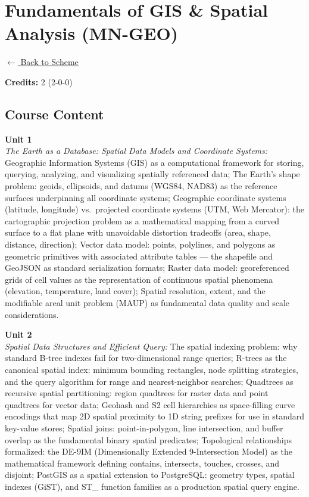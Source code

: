 \section*{Fundamentals of GIS \& Spatial Analysis (MN-GEO)}
\label{minor:GEO_L1}

\noindent \small{\hyperref[main:scheme]{$\leftarrow$ Back to Scheme}} \vspace{0.5cm}

\noindent \textbf{Credits:} 2 (2-0-0)

\subsection*{Course Content}
\noindent\textbf{Unit 1} \\
\textit{The Earth as a Database: Spatial Data Models and Coordinate Systems:} Geographic Information Systems (GIS) as a computational framework for storing, querying, analyzing, and visualizing spatially referenced data; The Earth's shape problem: geoids, ellipsoids, and datums (WGS84, NAD83) as the reference surfaces underpinning all coordinate systems; Geographic coordinate systems (latitude, longitude) vs.\ projected coordinate systems (UTM, Web Mercator): the cartographic projection problem as a mathematical mapping from a curved surface to a flat plane with unavoidable distortion tradeoffs (area, shape, distance, direction); Vector data model: points, polylines, and polygons as geometric primitives with associated attribute tables — the shapefile and GeoJSON as standard serialization formats; Raster data model: georeferenced grids of cell values as the representation of continuous spatial phenomena (elevation, temperature, land cover); Spatial resolution, extent, and the modifiable areal unit problem (MAUP) as fundamental data quality and scale considerations.

\vspace{0.3cm}

\noindent\textbf{Unit 2} \\
\textit{Spatial Data Structures and Efficient Query:} The spatial indexing problem: why standard B-tree indexes fail for two-dimensional range queries; R-trees as the canonical spatial index: minimum bounding rectangles, node splitting strategies, and the query algorithm for range and nearest-neighbor searches; Quadtrees as recursive spatial partitioning: region quadtrees for raster data and point quadtrees for vector data; Geohash and S2 cell hierarchies as space-filling curve encodings that map 2D spatial proximity to 1D string prefixes for use in standard key-value stores; Spatial joins: point-in-polygon, line intersection, and buffer overlap as the fundamental binary spatial predicates; Topological relationships formalized: the DE-9IM (Dimensionally Extended 9-Intersection Model) as the mathematical framework defining contains, intersects, touches, crosses, and disjoint; PostGIS as a spatial extension to PostgreSQL: geometry types, spatial indexes (GiST), and ST\_ function families as a production spatial query engine.

